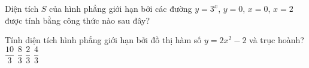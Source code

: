 \begin{ex}Diện tích $S$ của hình phẳng giới hạn bởi các đường $y = 3^x$, $y = 0$, $x = 0$, $x = 2$ được tính bằng công thức nào sau đây?
\end{ex}
\begin{ex}%
    Tính diện tích hình phẳng giới hạn bởi đồ thị hàm số $y=2x^2-2$ và trục hoành?
    \choice
    {$\dfrac{10}{3}$}
    {\True $\dfrac{8}{3}$}
    {$\dfrac{2}{3}$}
    {$\dfrac{4}{3}$}
\end{ex}

